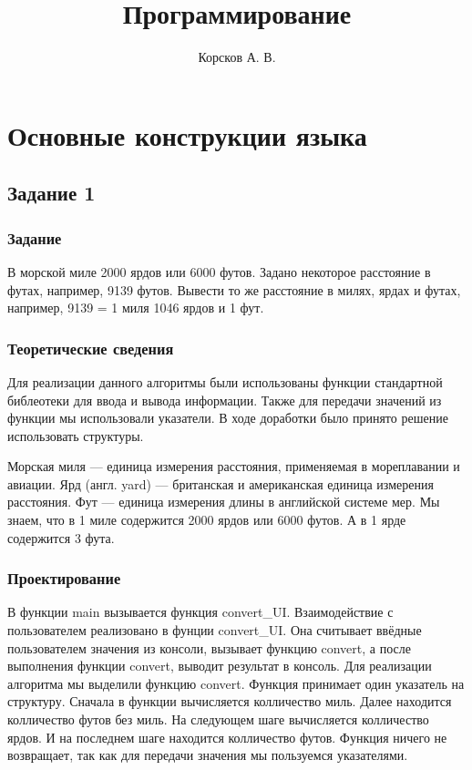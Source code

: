 \documentclass[12pt,a4paper]{report}
\author{Корсков А. В.}
\title{Программирование}
\begin{document}
\maketitle
\chapter{Основные конструкции языка}
\section{Задание 1}
\subsection{Задание}
В морской миле 2000 ярдов или 6000 футов. Задано некоторое расстояние в футах, например, 9139 футов. Вывести то же расстояние в милях, ярдах и футах, например, 9139 = 1 миля 1046 ярдов и 1 фут.
\subsection{Теоретические сведения}
Для реализации данного алгоритмы были использованы функции стандартной библеотеки для ввода и вывода информации. Также для передачи значений из функции мы использовали указатели. В ходе доработки было принято решение использовать структуры.

Морская миля — единица измерения расстояния, применяемая в мореплавании и авиации. Ярд (англ. yard) — британская и американская единица измерения расстояния. Фут — единица измерения длины в английской системе мер. Мы знаем, что в 1 миле содержится 2000 ярдов или 6000 футов. А в 1 ярде содержится 3 фута.
\subsection{Проектирование}
В функции main вызывается функция convert\_UI. Взаимодействие с пользователем реализовано в фунции convert\_UI. Она считывает ввёдные пользователем значения из консоли, вызывает функцию convert, а после выполнения функции convert, выводит результат в консоль. Для реализации алгоритма мы выделили функцию convert. Функция принимает один указатель на структуру. Сначала в функции вычисляется колличество миль. Далее находится колличество футов без миль. На следующем шаге вычисляется колличество ярдов. И на последнем шаге находится колличество футов. Функция ничего не возвращает, так как для передачи значения мы пользуемся указателями.
\end{document}
